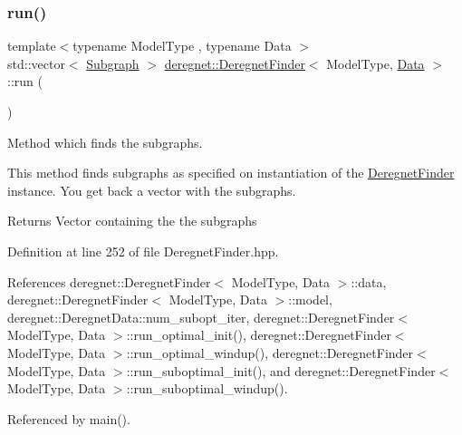 \subsubsection{\texorpdfstring{run()}{run()}}
{\footnotesize\ttfamily template$<$typename Model\+Type , typename Data $>$ \\
std\+::vector$<$ \hyperlink{structderegnet_1_1Subgraph}{Subgraph} $>$ \hyperlink{classderegnet_1_1DeregnetFinder}{deregnet\+::\+Deregnet\+Finder}$<$ Model\+Type, \hyperlink{avgdrgnt_8cpp_a1d1235306db276e9b36acba1db1509e8}{Data} $>$\+::run (\begin{DoxyParamCaption}{ }\end{DoxyParamCaption})}



Method which finds the subgraphs. 

This method finds subgraphs as specified on instantiation of the \hyperlink{classderegnet_1_1DeregnetFinder}{Deregnet\+Finder} instance. You get back a vector with the subgraphs.

\begin{DoxyReturn}{Returns}
Vector containing the the subgraphs 
\end{DoxyReturn}


Definition at line 252 of file Deregnet\+Finder.\+hpp.



References deregnet\+::\+Deregnet\+Finder$<$ Model\+Type, Data $>$\+::data, deregnet\+::\+Deregnet\+Finder$<$ Model\+Type, Data $>$\+::model, deregnet\+::\+Deregnet\+Data\+::num\+\_\+subopt\+\_\+iter, deregnet\+::\+Deregnet\+Finder$<$ Model\+Type, Data $>$\+::run\+\_\+optimal\+\_\+init(), deregnet\+::\+Deregnet\+Finder$<$ Model\+Type, Data $>$\+::run\+\_\+optimal\+\_\+windup(), deregnet\+::\+Deregnet\+Finder$<$ Model\+Type, Data $>$\+::run\+\_\+suboptimal\+\_\+init(), and deregnet\+::\+Deregnet\+Finder$<$ Model\+Type, Data $>$\+::run\+\_\+suboptimal\+\_\+windup().



Referenced by main().


